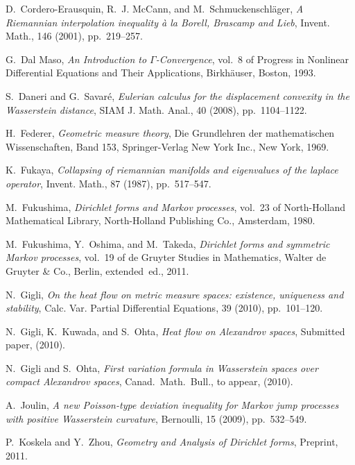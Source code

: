 \documentclass[reqno,11pt]{article}
\numberwithin{equation}{section}
\begin{document}
\begin{thebibliography}{10}
{\sc D.~Cordero-Erausquin, R.~J. McCann, and M.~Schmuckenschl{\"a}ger}, {\em A
  {R}iemannian interpolation inequality \`a la {B}orell, {B}rascamp and
  {L}ieb}, Invent. Math., 146 (2001), pp.~219--257.

{\sc G.~{Dal Maso}}, {\em An Introduction to ${\Gamma}$-Convergence}, vol.~8 of
  Progress in Nonlinear Differential Equations and Their Applications,
  Birkh\"auser, Boston, 1993.

{\sc S.~Daneri and G.~Savar\'e}, {\em {E}ulerian calculus for the displacement
  convexity in the {W}asserstein distance}, SIAM J. Math. Anal., 40 (2008),
  pp.~1104--1122.

{\sc H.~Federer}, {\em Geometric measure theory}, Die Grundlehren der
  mathematischen Wissenschaften, Band 153, Springer-Verlag New York Inc., New
  York, 1969.

{\sc K.~Fukaya}, {\em Collapsing of riemannian manifolds and eigenvalues of the
  laplace operator}, Invent. Math., 87 (1987), pp.~517--547.

{\sc M.~Fukushima}, {\em Dirichlet forms and {M}arkov processes}, vol.~23 of
  North-Holland Mathematical Library, North-Holland Publishing Co., Amsterdam,
  1980.

{\sc M.~Fukushima, Y.~Oshima, and M.~Takeda}, {\em Dirichlet forms and
  symmetric {M}arkov processes}, vol.~19 of de Gruyter Studies in Mathematics,
  Walter de Gruyter \& Co., Berlin, extended~ed., 2011.

{\sc N.~Gigli}, {\em On the heat flow on metric measure spaces: existence,
  uniqueness and stability}, Calc. Var. Partial Differential Equations, 39
  (2010), pp.~101--120.

{\sc N.~Gigli, K.~Kuwada, and S.~Ohta}, {\em Heat flow on {A}lexandrov spaces},
  Submitted paper,  (2010).

{\sc N.~Gigli and S.~Ohta}, {\em First variation formula in {W}asserstein
  spaces over compact {A}lexandrov spaces}, Canad.\ Math.\ Bull., to appear,
  (2010).

{\sc A.~Joulin}, {\em A new {P}oisson-type deviation inequality for {M}arkov
  jump processes with positive {W}asserstein curvature}, Bernoulli, 15 (2009),
  pp.~532--549.

{\sc P.~Koskela and Y.~Zhou}, {\em Geometry and {A}nalysis of {D}irichlet
  forms}, Preprint, 2011.


\end{thebibliography}
\end{document}
